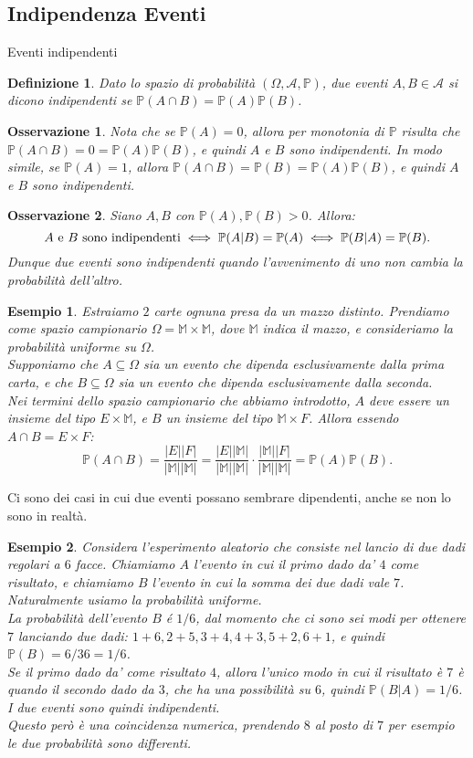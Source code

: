 \documentclass[11pt]{book}
\theoremstyle{Definizione}
\newtheorem*{mydef}{Definizione}
\theoremstyle{TeoremaProposizioneLemmaCorollario}
\theoremstyle{OsservazioneNota}
\newtheorem{myobs}{Osservazione}[section]
\newtheorem{myes}{Esempio}[section]
\renewcommand{\P}{\mathbb{P}}
\begin{document}
\subsection{Indipendenza Eventi}
\begin{boxdef}{Eventi indipendenti}
\begin{mydef}
Dato lo spazio di probabilità $(\Omega,\mathcal{A},\P)$, due eventi $A,B\in \mathcal{A}$ si dicono indipendenti se $\P(A\cap B) = \P(A)\P(B)$.
\end{mydef}
\end{boxdef}
\begin{myobs}
Nota che se $\P(A) = 0$, allora per monotonia di $\P$ risulta che $\P(A\cap B) = 0 = \P(A)\P(B)$, e quindi $A$ e $B$ sono indipendenti. In modo simile, se $\P(A) = 1$, allora $\P(A\cap B) = \P(B) = \P(A)\P(B)$, e quindi $A$ e $B$ sono indipendenti.
\end{myobs}
\begin{myobs}
Siano $A,B$ con $\P(A),\P(B) > 0$. Allora:
$$
A\textup{ e }B\textup{ sono indipendenti}\iff \P(A|B) = \P(A) \iff \P(B|A) = \P(B).
$$
Dunque due eventi sono indipendenti quando l'avvenimento di uno non cambia la probabilità dell'altro.
\end{myobs}
\begin{myes}
Estraiamo $2$ carte ognuna presa da un mazzo distinto. Prendiamo come spazio campionario $\Omega = \mathbb{M}\times \mathbb{M}$, dove $\mathbb{M}$ indica il mazzo, e consideriamo la probabilità uniforme su $\Omega$.\\
Supponiamo che $A\subseteq \Omega$ sia un evento che dipenda esclusivamente dalla prima carta, e che $B\subseteq \Omega$ sia un evento che dipenda esclusivamente dalla seconda.\\
Nei termini dello spazio campionario che abbiamo introdotto, $A$ deve essere un insieme del tipo $E\times \mathbb{M}$, e $B$ un insieme del tipo $\mathbb{M}\times F$. Allora essendo $A\cap B = E\times F$:
$$
\P(A\cap B) = \frac{|E||F|}{|\mathbb{M}||\mathbb{M}|} = \frac{|E||\mathbb{M}|}{|\mathbb{M}||\mathbb{M}|}\cdot \frac{|\mathbb{M}||F|}{|\mathbb{M}||\mathbb{M}|} = \P(A)\P(B).
$$
\end{myes}
Ci sono dei casi in cui due eventi possano sembrare dipendenti, anche se non lo sono in realtà.
\begin{myes}
Considera l'esperimento aleatorio che consiste nel lancio di due dadi regolari a $6$ facce. Chiamiamo $A$ l'evento in cui il primo dado da' $4$ come risultato, e chiamiamo $B$ l'evento in cui la somma dei due dadi vale $7$. Naturalmente usiamo la probabilità uniforme.\\
La probabilità dell'evento $B$ é $1/6$, dal momento che ci sono sei modi per ottenere $7$ lanciando due dadi: $1+6,2+5,3+4,4+3,5+2,6+1$, e quindi $\P(B) = 6/36 = 1/6$.\\
Se il primo dado da' come risultato $4$, allora l'unico modo in cui il risultato è $7$ è quando il secondo dado da $3$, che ha una possibilità su $6$, quindi $\P(B|A) = 1/6$. I due eventi sono quindi indipendenti.\\
Questo però è una coincidenza numerica, prendendo $8$ al posto di $7$ per esempio le due probabilità sono differenti.
\end{myes}
\end{document}

